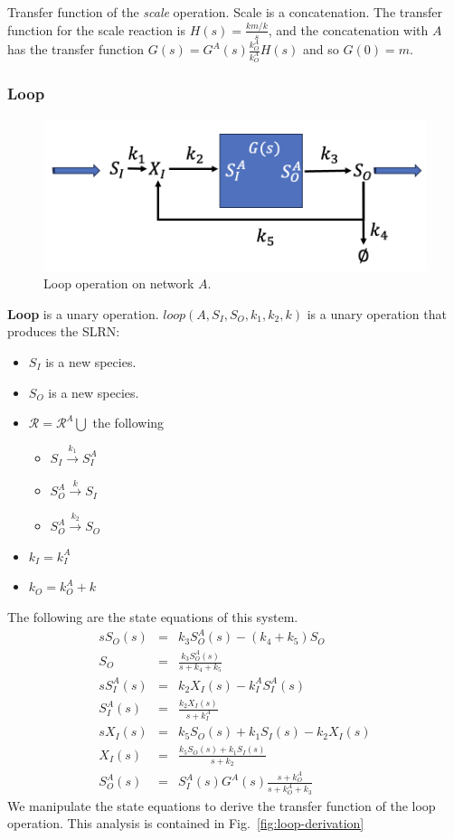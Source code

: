 \documentclass[unnumsec,webpdf,contemporary,large]{oup-authoring-template}%
\theoremstyle{thmstyleone}%
\theoremstyle{thmstyletwo}%
\theoremstyle{thmstylethree}%
\begin{document}
Transfer function of the {\em scale} operation.
Scale is a concatenation.
The transfer function for the scale reaction is
$H(s) = \frac{km/k } {s}$, and the concatenation with $A$
has the transfer function
$G(s) = G^A(s) \frac{k^A_O}{k^A_O} H(s)$ and so
$G(0) = m$.


\subsubsection{Loop}

\begin{figure}
         \centering
         \includegraphics[scale=0.4]{figures/loop.png}
          \caption[]{Loop operation on network $A$.}
         \label{fig:concatenate}
\end{figure}
{\bf Loop} is a unary operation.
$loop(A, S_I, S_O, k_1, k_2, k)$ is a unary operation that produces
the SLRN:
\begin{itemize}
\item $S_I$ is a new species.
\item $S_O$ is a new species.
\item $\mathcal{R} = \mathcal{R}^A \bigcup$ the following
\begin{itemize}
\item $S_I \xrightarrow{k_1} S^A_I$
\item $S^A_O \xrightarrow{k} S_I$
\item $S^A_O \xrightarrow{k_2} S_O$
\end{itemize}
\item $k_I = k^A_I$
\item $k_O = k^A_O + k$
\end{itemize}

The following are the state equations of this system.
\begin{eqnarray}
s S_O (s) & = & k_3 S^A_O (s) - (k_4 + k_5) S_O \nonumber \\
S_O & = & \frac{k_3 S^A_O(s)}{s + k_4 + k_5} \\
s S^A_I(s) & = & k_2 X_I(s) - k^A_I S^A_I(s) \nonumber \\
S^A_I(s) & = & \frac{k_2 X_I(s)}{s + k^A_I} \\
s X_I (s) & = & k_5 S_O(s) + k_1 S_I (s) - k_2 X_I (s) \nonumber \\
X_I(s) & = & \frac{k_5 S_O(s) + k_1 S_I (s)}{s + k_2} \\
S^A_O(s) & = & S^A_I(s) G^A(s) \frac{s + k^A_O}{s + k^A_O + k_3}
\end{eqnarray}
We manipulate the state equations to derive the transfer function of
the loop operation.
This analysis is contained in
Fig.~\ref{fig:loop-derivation}
\end{document}
